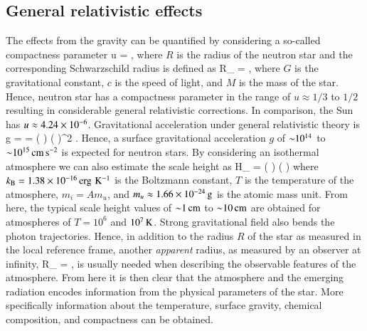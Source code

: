 \subsection{General relativistic effects}
The effects from the gravity can be quantified by considering a so-called compactness parameter
\be
u = ,
\ee
where $R$ is the radius of the neutron star and the corresponding Schwarzschild radius is defined as
\be
R_{} =    \km,
\ee
where $G$ is the gravitational constant, $c$ is the speed of light, and $M$ is the mass of the star.\cite[see e.g.,][]{Gravitation, Wald84}
Hence, neutron star has a compactness parameter in the range of $u \approx 1/3$ to $1/2$ resulting in considerable general relativistic corrections.
In comparison, the Sun has $u \approx 4.24 \times 10^{-6}$.
Gravitational acceleration under general relativistic theory is
\be
g =   =   \left(  \right) \left(  \right)^2 \cmss.
\ee
Hence, a surface gravitational acceleration $g$ of $\mathord{\sim} 10^{14}$ to $\mathord{\sim} 10^{15}\, \mathrm{cm}\,\mathrm{s}^{-2}$ is expected for neutron stars.
By considering an isothermal atmosphere we can also estimate the scale height as
\be
H_{} =  \approx {} \left(  \right) \left(  \right) \cm
\ee
where $k_{\mathrm{B}} = 1.38 \times 10^{-16} \, \mathrm{erg} \, \, \mathrm{K}^{-1}$ is the Boltzmann constant, $T$ is the temperature of the atmosphere, $m_i = A m_u$, and $m_u \approx 1.66 \times 10^{-24}\, \mathrm{g}$ is the atomic mass unit.
From here, the typical scale height values of $\mathord{\sim} 1\, \mathrm{cm}$ to $\mathord{\sim} 10\, \mathrm{cm}$ are obtained for atmospheres of $T=10^6$ and $10^7\, \mathrm{K}$.\cite{ZP02, Potekhin14}
Strong gravitational field also bends the photon trajectories.\cite[see e.g.,][]{PFC83}
Hence, in addition to the radius $R$ of the star as measured in the local reference frame, another \emph{apparent} radius, as measured by an observer at infinity, 
\be
R_{\infty} = ,
\ee
is usually needed when describing the observable features of the atmosphere.
From here it is then clear that the atmosphere and the emerging radiation encodes information from the physical parameters of the star.
More specifically information about the temperature, surface gravity, chemical composition, and compactness can be obtained.

